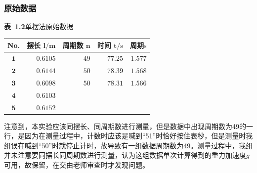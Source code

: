 \documentclass{article}
\def\kong{\hspace*{2em}}
\begin{document}
	\subsubsection{原始数据}
  	\begin{center}
			\textbf{表\ 1.2}\quad 单摆法原始数据\\[6pt]
      \begin{tabular}{|c|r|r|r|r|}
				\hline No. & 摆长 $\boldsymbol{l} / \mathbf{m}$ & 周期数
        $\boldsymbol{n}$ & 时间 $\boldsymbol{t} / \mathrm{s}$ & 周期$\mathrm{s}$\\
				\hline $\mathbf{1}$ & $0.6105$ & $49$ & $77.25$ &$1.577$\\
				\hline $\mathbf{2}$ & $0.6144$ & $50$ & $78.39$ &$1.568$\\
				\hline $\mathbf{3}$ & $0.6098$ & $50$ & $78.31$ &$1.566$\\
				\hline $\mathbf{4}$ & $0.6103$ &   &  &\\
        \hline $\mathbf{5}$ & $0.6152$ &   &  &\\
        \hline
			\end{tabular}
		\end{center}
    \kong 注意到，本实验应该同摆长、同周期数进行测量，但是数据中出现周期数为49的一行，是因为在测量过程中，计数时应该是喊到“51”时恰好按住表秒，但是测量时我组误在喊到“50”时就停止计时，故导致有一组数据周期数为49。测量过程中，我组并未注意要同摆长同周期数进行测量，认为这组数据单次计算得到的重力加速度$g$可用，故保留，在交由老师审查时才发现问题。
\end{document}
